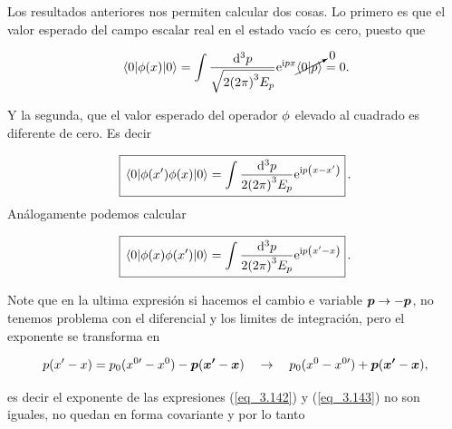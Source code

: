 Los resultados anteriores nos permiten calcular dos cosas. Lo primero es que el valor esperado del campo escalar real en el estado vacío es cero, puesto que

\begin{equation}
    \ev{\Ophi \qty(x)}{0} = \int \frac{\dd[3]{p}}{\sqrt{2\qty(2\pi)^{3}E_p}} \ee^{\ii px} \cancelto{0}{\braket{0}{p}} = 0.
\end{equation}

Y la segunda, que el valor esperado del operador $\phi$ elevado al cuadrado es diferente de cero. Es decir


\begin{equation}
    \boxed{
    \ev{ \Ophi \qty(x^\prime) \Ophi \qty(x)}{0} = \int  \frac{\dd[3]{p}}{2\qty(2\pi)^{3}E_p} \ee^{\ii p \qty(x - x^\prime)} } \, .
    \label{eq_3.142}
\end{equation}
Análogamente podemos calcular

\begin{equation}
    \boxed{
    \ev{ \Ophi \qty(x) \Ophi \qty(x^\prime)}{0} = \int  \frac{\dd[3]{p}}{2\qty(2\pi)^{3}E_p} \ee^{\ii p \qty(x^\prime - x)} } \, .
    \label{eq_3.143}
\end{equation}

Note que en la ultima expresión si hacemos el cambio e variable $ \vb*{p} \to -\vb*{p}$, no tenemos problema con el diferencial y los limites de integración, pero el exponente se transforma en

\begin{equation*}
    p(x^\prime-x) = p_0(x^{0\prime} - x^0 ) - \vb*{p}(\vb*{x^\prime}-\vb*{x}) \quad \to \quad  p_0(x^0 - x^{0\prime}) + \vb*{p}(\vb*{x^\prime}-\vb*{x}),
\end{equation*}

es decir el exponente de las expresiones (\ref{eq_3.142}) y (\ref{eq_3.143}) no son iguales, no quedan en forma covariante y por lo tanto


